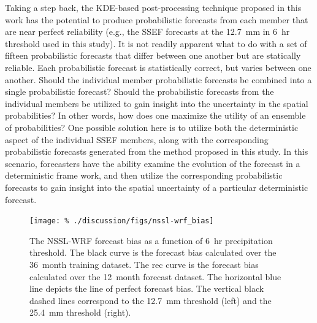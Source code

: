 Taking a step back, the KDE-based post-processing technique proposed in this work has the potential to produce probabilistic forecasts from each member that are near perfect reliability (e.g., the SSEF forecasts at the \mbox{12.7 mm} in \mbox{6 hr} threshold used in this study).
It is not readily apparent what to do with a set of fifteen probabilistic forecasts that differ between one another but are statically reliable.
Each probabilistic forecast is statistically correct, but varies between one another.
Should the individual member probabilistic forecasts be combined into a single probabilistic forecast?
Should the probabilistic forecasts from the individual members be utilized to gain insight into the uncertainty in the spatial probabilities?
In other words, how does one maximize the utility of an ensemble of probabilities?
One possible solution here is to utilize both the deterministic aspect of the individual SSEF members, along with the corresponding probabilistic forecasts generated from the method proposed in this study.
In this scenario, forecasters have the ability examine the evolution of the forecast in a deterministic frame work, and then utilize the corresponding probabilistic forecasts to gain insight into the spatial uncertainty of a particular deterministic forecast.












\clearpage
\begin{figure}[cc]
    \centering
    \texttt{[image: \%
    ./discussion/figs/nssl-wrf\_bias]}\\
    \caption{The NSSL-WRF forecast bias as a function of \mbox{6 hr} precipitation threshold.
    The black curve is the forecast bias calculated over the \mbox{36 month} training dataset.
    The rec curve is the forecast bias calculated over the \mbox{12 month} forecast dataset.
    The horizontal blue line depicts the line of perfect forecast bias.
    The vertical black dashed lines correspond to the \mbox{12.7 mm} threshold (left) and the \mbox{25.4 mm} threshold (right).}
    \label{nssl-wrf_bias}
\end{figure}


